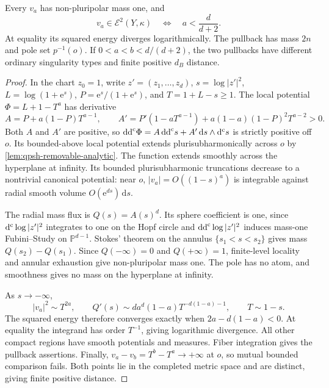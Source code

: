 \begin{proposition}\label{prop:hopf-singular-basic-energy}
Every $v_a$ has non-pluripolar mass one, and
\[
 v_a\in\mathcal E^2(Y,\kappa)
 \quad\Longleftrightarrow\quad a<\frac d{d+2}.
\]
At equality its squared energy diverges logarithmically. The pullback has mass $2n$ and pole set $p^{-1}(o)$. If $0<a<b<d/(d+2)$, the two pullbacks have different ordinary singularity types and finite positive $d_B$ distance.
\end{proposition}
\begin{proof}
In the chart $z_0=1$, write $z'=(z_1,\ldots,z_d)$, $s=\log|z'|^2$, $L=\log(1+\mathrm e^s)$, $P=\mathrm e^s/(1+\mathrm e^s)$, and $T=1+L-s\geq1$. The local potential $\Phi=L+1-T^a$ has derivative
\[
 A=P+a(1-P)T^{a-1},\qquad
 A'=P'(1-aT^{a-1})+a(1-a)(1-P)^2T^{a-2}>0.
\]
Both $A$ and $A'$ are positive, so $\mathrm{dd}^{\mathrm{c}}\Phi=A\,\mathrm{dd}^{\mathrm{c}} s+A'\,\mathrm ds\wedge\mathrm d^{\mathrm c} s$ is strictly positive off $o$. Its bounded-above local potential extends plurisubharmonically across $o$ by \cref{lem:qpsh-removable-analytic}. The function extends smoothly across the hyperplane at infinity. Its bounded plurisubharmonic truncations decrease to a nontrivial canonical potential: near $o$, $|v_a|=O((1-s)^a)$ is integrable against radial smooth volume $O(\mathrm e^{ds})\,\mathrm ds$.

The radial mass flux is $Q(s)=A(s)^d$. Its sphere coefficient is one, since $\mathrm d^{\mathrm c}\log|z'|^2$ integrates to one on the Hopf circle and $\mathrm{dd}^{\mathrm{c}}\log|z'|^2$ induces mass-one Fubini--Study on $\mathbb P^{d-1}$. Stokes' theorem on the annulus $\{s_1<s<s_2\}$ gives mass $Q(s_2)-Q(s_1)$. Since $Q(-\infty)=0$ and $Q(+\infty)=1$, finite-level locality and annular exhaustion give non-pluripolar mass one. The pole has no atom, and smoothness gives no mass on the hyperplane at infinity.

As $s\to-\infty$,
\[
 |v_a|^2\sim T^{2a},\qquad
 Q'(s)\sim d a^d(1-a)T^{-d(1-a)-1},\qquad T\sim1-s.
\]
The squared energy therefore converges exactly when $2a-d(1-a)<0$. At equality the integrand has order $T^{-1}$, giving logarithmic divergence. All other compact regions have smooth potentials and measures. Fiber integration gives the pullback assertions. Finally, $v_a-v_b=T^b-T^a\to+\infty$ at $o$, so mutual bounded comparison fails. Both points lie in the completed metric space and are distinct, giving finite positive distance.
\end{proof}

